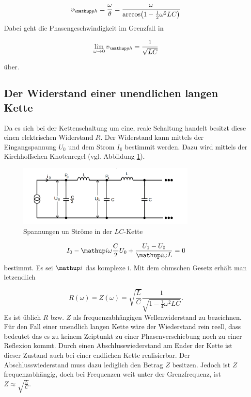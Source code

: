 \begin{equation}
\label{eq:phasen_esc}
v\ua{ph}=\frac{\omega}{\theta}=\frac{\omega}{\arccos\!\left(1-\frac{1}{2}\omega^2LC\right)}
\end{equation}
Dabei geht die Phasengeschwindigkeit im Grenzfall in

\begin{equation*}
\lim_{\omega\to 0}v\ua{ph}=\frac{1}{\sqrt{LC}}
\end{equation*}

über.
\subsection{Der Widerstand einer unendlichen langen Kette}
Da es sich bei der Kettenschaltung um eine, reale Schaltung handelt
besitzt diese einen elektrischen Widerstand $R$.
Der Widerstand kann mittels der Eingangspannung $U_0$ und dem Strom $I_0$ bestimmit werden.
Dazu wird mittels der Kirchhoffschen Knotenregel (vgl. Abbildung \ref{fig:bestimmung_impe}).
\begin{figure}
  \centering
  \includegraphics[width=0.8\textwidth]{bilder/eigenimpendanz.png}
  \caption{Spannungen un Ströme in der $LC$-Kette}
  \label{fig:bestimmung_impe}
\end{figure}
\begin{equation*}
I_0 - \map{i}\omega\frac{C}{2}U_0+\frac{U_1-U_0}{\map{i}\omega L}=0
\end{equation*}
bestimmt.
Es sei $\map{i}$ das komplexe i.
Mit dem ohmschen Gesetz erhält man letzendlich

\begin{equation}
R(\omega)=Z(\omega)=\sqrt{\frac{L}{C}}\frac{1}{\sqrt{1-\frac{1}{4}\omega^2LC}}.
\end{equation}
Es ist üblich $R$ bzw. $Z$ als frequenzabhängigen Wellenwiderstand zu bezeichnen.
Für den Fall einer unendlich langen Kette wäre der Wiederstand rein reell, dass bedeutet 
das es zu keinem Zeiptunkt zu einer Phasenverschiebung noch zu einer Reflexion kommt.
Durch einen Abschlusswiederstand am Ender der Kette ist dieser Zustand auch bei einer endlichen Kette 
realisierbar. Der Abschlusswiederstand muss dazu lediglich den Betrag $Z$ besitzen.
Jedoch ist $Z$ frequenzabhängig, doch bei Frequenzen weit unter der Grenzfrequenz, ist 
$Z\approx \sqrt{\frac{L}{C}}$.

